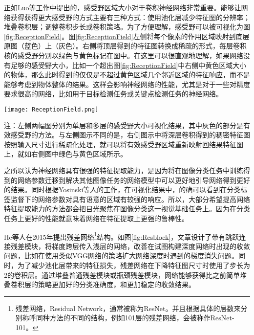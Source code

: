 正如Luo等工作\cite{luo2016understanding}中提出的，感受野区域大小对于卷积神经网络非常重要。能够让网络获得获得更大感受野的方式主要有三种方式：使用池化层减少特征图的分辨率；堆叠卷积层；调整卷积步长或卷积策略。为了方便理解，感受野可以被可视化为图\ref{fig:ReceptionField}。图\ref{fig:ReceptionField}左侧将每个像素的作用区域映射到底层原图（蓝色）上（灰色）。右侧将顶层得到的特征图转换成稀疏的形式，每层卷积核的感受野分别以绿色与黄色标记在图中。在这里可以很直观地理解，如果网络没有足够的感受野大小，比如一个超出图\ref{fig:ReceptionField}中右侧中黄色区域大小的物体，那么此时得到的仅仅是不超过黄色区域几个邻近区域的特征响应，而不是能够考虑到物体整体的结果。这样会影响神经网络的性能，尤其是对于一些对精度要求很高的网络，比如用于目标检测任务或关键点检测任务的神经网络。

\begin{figure*}[htbp]	
	\centering
	\texttt{[image: ReceptionField.png]}
	\caption{两种可视化感受野的方法\cite{fang2017reception}}
	\begin{minipage}{0.8\textwidth}
		\wuhao
		注：左侧两幅图分别为单层和多层的感受野大小可视化结果，其中灰色的部分是有效感受野的方法。与左侧图示不同的是，右侧图示中将深层卷积得到的稠密特征图按照输入尺寸进行稀疏化处理，就可以将有效感受野区域重新映射回结果特征图上，就如右侧图中绿色与黄色区域所示。
	\end{minipage}
	\label{fig:ReceptionField}
\end{figure*}

之所以认为神经网络具有很强的特征提取能力，是因为将在图像分类任务中训练得到的网络参数迁移到解决其他图像任务的网络模型中可以更好地引导网络得到更好的结果\cite{mishkin2015all}。同时根据Yosinski等人的工作\cite{yosinski2015understanding}，在可视化结果中，的确可以看到在分类标签监督下的网络参数对具有语意的区域有较强的响应。所以，大部分希望提高网络特征提取能力的方法都会把目光聚焦在图像分类这一视觉基础任务上。因为在分类任务上更好的性能就意味着网络在特征提取上更强的鲁棒性。

He等人在2015年提出残差网络\footnote{残差网络，Residual Network，通常被称为ResNet。并且根据具体的层数来分别称呼同种方法的不同的结构，例如101层的残差网络，会被称作ResNet-101。}结构\cite{He2015Deep}。如图\ref{fig:Resblock}，文章设计了带有跳跃连接残差模块，将梯度跨层传入浅层的网络，改善在试图构建深度网络时出现的收敛问题，比如在使用类似VGG网络\cite{simonyan2014very}的策略扩大网络深度时遇到的梯度消失问题。同时，为了减少池化层带来的特征损失，残差网络在下降特征图尺寸时使用了步长为2的卷积层。通过堆叠普通残差模块或瓶颈残差模块，网络能够获得比之前简单堆叠卷积层的策略更加好的分类准确度，和更加稳定的收敛结果。

